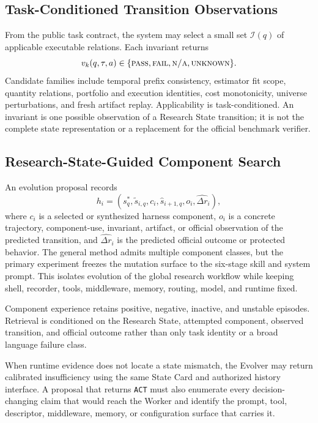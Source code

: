 \subsection{Task-Conditioned Transition Observations}

From the public task contract, the system may select a small set
$\mathcal{I}(q)$ of applicable executable relations. Each invariant returns
\begin{equation}
    v_k(q,\tau,a) \in
    \{\textsc{pass},\textsc{fail},\textsc{n/a},\textsc{unknown}\}.
\end{equation}
Candidate families include temporal prefix consistency, estimator fit scope,
quantity relations, portfolio and execution identities, cost monotonicity,
universe perturbations, and fresh artifact replay. Applicability is
task-conditioned. An invariant is one possible observation of a Research State
transition; it is not the complete state representation or a replacement for
the official benchmark verifier.

\subsection{Research-State-Guided Component Search}

An evolution proposal records
\begin{equation}
    h_i = (s^*_q,\tilde{s}_{i,q},c_i,\hat{s}_{i+1,q},o_i,
    \widehat{\Delta r}_i),
\end{equation}
where $c_i$ is a selected or synthesized harness component, $o_i$ is a concrete
trajectory, component-use, invariant, artifact, or official observation of the
predicted transition, and $\widehat{\Delta r}_i$ is the predicted official
outcome or protected behavior. The general method admits multiple component
classes, but the primary experiment freezes the mutation surface to the
six-stage skill and system prompt. This isolates evolution of the global
research workflow while keeping shell, recorder, tools, middleware, memory,
routing, model, and runtime fixed.

Component experience retains positive, negative, inactive, and unstable
episodes. Retrieval is conditioned on the Research State, attempted component,
observed transition, and official outcome rather than only task identity or a
broad language failure class.

When runtime evidence does not locate a state mismatch, the Evolver may return
calibrated insufficiency using the same State Card and authorized history
interface. A proposal that returns \texttt{ACT} must also enumerate every
decision-changing claim that would reach the Worker and identify the prompt,
tool, descriptor, middleware, memory, or configuration surface that carries it.

